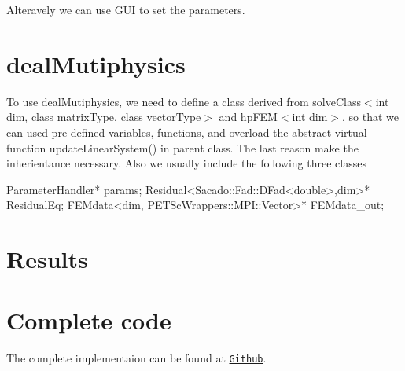  Alteravely we can use G\+UI to set the parameters. \hypertarget{_intercalation_lib}{}\section{deal\+Mutiphysics}\label{_intercalation_lib}
To use deal\+Mutiphysics, we need to define a class derived from {\ttfamily solve\+Class$<$int dim, class matrix\+Type, class vector\+Type$>$} and {\ttfamily hp\+F\+E\+M$<$int dim$>$}, so that we can used pre-\/defined variables, functions, and overload the abstract virtual function {\ttfamily update\+Linear\+System()} in parent class. The last reason make the inherientance necessary. Also we usually include the following three classes 
\begin{DoxyCode}
ParameterHandler* params;   
Residual<Sacado::Fad::DFad<double>,dim>* ResidualEq;
FEMdata<dim, PETScWrappers::MPI::Vector>* FEMdata\_out;
\end{DoxyCode}
 \hypertarget{_intercalation_results}{}\section{Results}\label{_intercalation_results}
    \hypertarget{_intercalation_com}{}\section{Complete code}\label{_intercalation_com}
The complete implementaion can be found at \href{https://github.com/mechanoChem/mechanoChemFEM/tree/example/Example1%20Intercalation}{\tt Github}. 